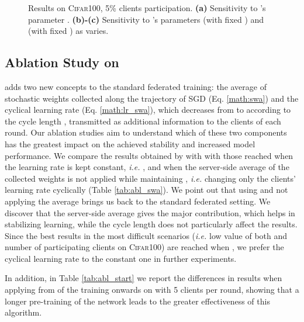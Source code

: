 \captionsetup[subfloat]{font=scriptsize,labelformat=parens}
\begin{figure}[]
    \centering
    \caption{Results on \textsc{Cifar100}, 5\% clients participation. \textbf{(a)} Sensitivity to \sam's parameter . \textbf{(b)-(c)} Sensitivity to \asam's parameters  (with fixed ) and  (with fixed ) as  varies.}
    \label{fig:sensitivity}
\end{figure}

\subsection{Ablation Study on \swa}
\label{app:abl_swa}
\swa adds two new concepts to the standard federated training: the average of stochastic weights collected along the trajectory of SGD (Eq. \ref{math:swa}) and the cyclical learning rate (Eq. \ref{math:lr_swa}), which decreases from  to  according to the cycle length , transmitted as additional information to the clients of each round. Our ablation studies aim to understand which of these two components has the greatest impact on the achieved stability and increased model performance. We compare the results obtained by \swa with  with those reached when the learning rate is kept constant, \textit{i.e.} , and when the server-side average of the collected weights is not applied while maintaining , \textit{i.e.} changing only the clients' learning rate cyclically (Table \ref{tab:abl_swa}). We point out that using  and not applying the average brings us back to the standard federated setting. We discover that the server-side average gives the major contribution, which helps in stabilizing learning, while the cycle length does not particularly affect the results. Since the best results in the most difficult scenarios (\textit{i.e.} low value of both  and number of participating clients on \textsc{Cifar100}) are reached when , we prefer the cyclical learning rate to the constant one in further experiments.

In addition, in Table \ref{tab:abl_start} we report the differences in results when applying \swa from  of the training onwards on \fedavg with 5 clients per round, showing that a longer pre-training of the network leads to the greater effectiveness of this algorithm.

